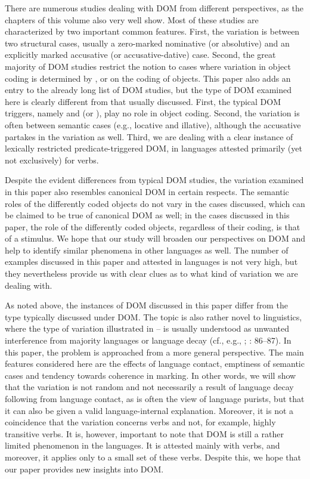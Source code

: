 \documentclass[output=paper]{LSP/langsci}
\begin{document}
There are numerous studies dealing with DOM from different perspectives, as the chapters of this volume also very well show. Most of these studies are characterized by two important common features. First, the variation is between two structural cases, usually a zero-marked nominative (or absolutive) and an explicitly marked accusative (or accusative-dative) case. Second, the great majority of DOM studies restrict the notion to cases where variation in object coding is determined by ,  or  on the coding of objects. This paper also adds an entry to the already long list of DOM studies, but the type of DOM examined here is clearly different from that usually discussed. First, the typical DOM triggers, namely  and  (or ), play no role in object coding. Second, the variation is often between semantic cases (e.g., locative and illative), although the accusative partakes in the variation as well. Third, we are dealing with a clear instance of lexically restricted predicate-triggered DOM, in  languages attested primarily (yet not exclusively) for  verbs.

Despite the evident differences from typical DOM studies, the variation examined in this paper also resembles canonical DOM in certain respects. The semantic roles of the differently coded objects do not vary in the cases discussed, which can be claimed to be true of canonical DOM as well; in the cases discussed in this paper, the role of the differently coded objects, regardless of their coding, is that of a stimulus. We hope that our study will broaden our perspectives on DOM and help to identify similar phenomena in other languages as well. The number of examples discussed in this paper and attested in  languages is not very high, but they nevertheless provide us with clear clues as to what kind of variation we are dealing with.

As noted above, the instances of DOM discussed in this paper differ from the type typically discussed under DOM. The topic is also rather novel to  linguistics, where the type of variation illustrated in -- is usually understood as unwanted interference from majority languages or language decay (cf., e.g., \citealt[425]{Vuolab-Lohi2007Mailmmi}; \citealt{Olthuis2009Mii}: 86–87). In this paper, the problem is approached from a more general perspective. The main features considered here are the effects of language contact, emptiness of semantic cases and tendency towards coherence in marking. In other words, we will show that the variation is not random and not necessarily a result of language decay following from language contact, as is often the view of language purists, but that it can also be given a valid language-internal explanation. Moreover, it is not a coincidence that the variation concerns  verbs and not, for example, highly transitive verbs. It is, however, important to note that DOM is still a rather limited phenomenon in the  languages. It is attested mainly with  verbs, and moreover, it applies only to a small set of these verbs. Despite this, we hope that our paper provides new insights into DOM.
\end{document}
